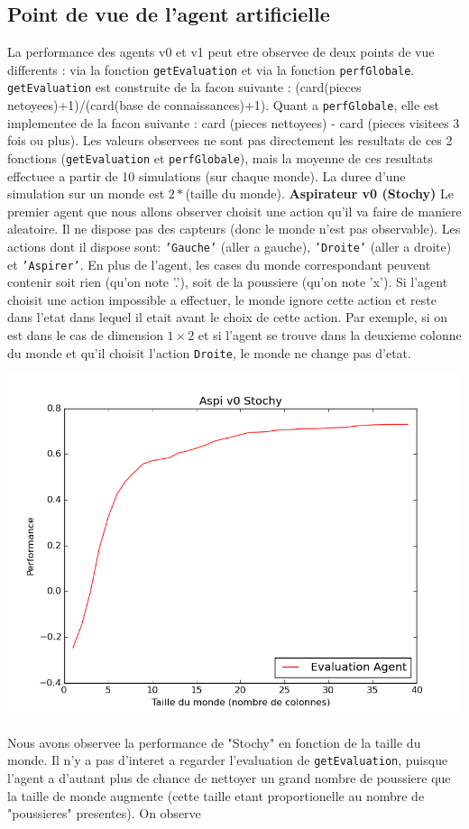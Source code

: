 \documentclass[12pt]{article}
\begin{document}
\subsection{Point de vue de l'agent artificielle }
\justify
La performance des agents v0 et v1 peut etre observee de deux points de vue differents : via la fonction \texttt{getEvaluation} et via la fonction \texttt{perfGlobale}. \texttt{getEvaluation} est construite de la facon suivante : (card(pieces netoyees)+1)/(card(base de connaissances)+1). Quant a \texttt{perfGlobale}, elle est implementee de la facon suivante : card (pieces nettoyees) - card (pieces visitees 3 fois ou plus). 
\justify
Les valeurs observees ne sont pas directement les resultats de ces 2 fonctions (\texttt{getEvaluation} et \texttt{perfGlobale}), mais la moyenne de ces resultats effectuee a partir de 10 simulations (sur chaque monde). 
\justify
La duree d'une simulation sur un monde est $2*$(taille du monde). 
\justify
\textbf{Aspirateur v0 (Stochy)}
\justify
Le premier agent que nous allons observer choisit une action qu'il va faire de maniere aleatoire. Il ne dispose pas des capteurs (donc le monde n'est pas observable). Les actions dont il dispose sont: \texttt{'Gauche'} (aller a gauche), \texttt{'Droite'} (aller a droite) et \texttt{'Aspirer'}.
\justify 
En plus de l'agent, les cases du monde correspondant peuvent contenir soit rien (qu'on note '.'), soit de la poussiere (qu'on note 'x'). Si l'agent choisit une action impossible a effectuer, le monde ignore cette action et reste dans l'etat dans lequel il etait avant le choix de cette action. Par exemple, si on est dans le cas de dimension $1 \times 2$ et si l'agent se trouve dans la deuxieme colonne du monde et qu'il choisit l'action \texttt{Droite}, le monde ne change pas d'etat. 
\begin{center}
\includegraphics[scale=0.65]{figure_1}
\end{center}
\justify
Nous avons observee la performance de "Stochy" en fonction de la taille du monde. Il n'y a pas d'interet a regarder l'evaluation de \texttt{getEvaluation}, puisque l'agent a d'autant plus de chance de nettoyer un grand nombre de poussiere que la taille de monde augmente (cette taille etant proportionelle au nombre de "poussieres" presentes). On observe 
\end{document}
